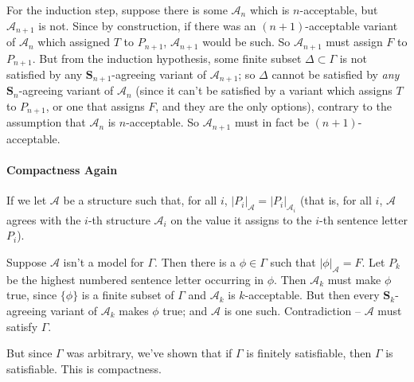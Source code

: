For the induction step, suppose there is some $\mathscr{A}_{n}$ which is $n$-acceptable, but $\mathscr{A}_{n+1}$ is not. Since by construction, if there was an $(n+1)$-acceptable variant of $\mathscr{A}_{n}$ which assigned $T$ to $P_{n+1}$, $\mathscr{A}_{n+1}$ would be such. So $\mathscr{A}_{n+1}$ must assign $F$ to $P_{n+1}$. But from the induction hypothesis, some finite subset $\Delta\subset \Gamma$ is not satisfied by any $\mathbf{S}_{n+1}$-agreeing variant of $\mathscr{A}_{n+1}$; so $\Delta$ cannot be satisfied by \emph{any} $\mathbf{S}_{n}$-agreeing variant of $\mathscr{A}_{n}$ (since it can't be satisfied by a variant which assigns $T$ to $P_{n+1}$, or one that assigns $F$, and they are the only options), contrary to the assumption that $\mathscr{A}_{n}$ is $n$-acceptable. So $\mathscr{A}_{n+1}$ must in fact be $(n+1)$-acceptable.


\paragraph{Compactness Again}

If we let $\mathscr{A}$ be a structure such that, for all $i$, $|P_{i}|_{\mathscr{A}}=|P_{i}|_{\mathscr{A}_{i}}$ (that is, for all $i$, $\mathscr{A}$ agrees with the $i$-th structure $\mathscr{A}_{i}$ on the value it assigns to the $i$-th sentence letter $P_{i}$). 

Suppose $\mathscr{A}$ isn't a model for $\Gamma$. Then there is a $\phi \in \Gamma$ such that $|\phi|_{\mathscr{A}}=F$. Let $P_{k}$ be the highest numbered sentence letter occurring in $\phi$. Then $\mathscr{A}_{k}$ must make $\phi$ true, since $\{\phi\}$ is a finite subset of $\Gamma$ and $\mathscr{A}_{k}$ is $k$-acceptable. But then every $\mathbf{S}_{k}$-agreeing variant of $\mathscr{A}_{k}$ makes $\phi$ true; and $\mathscr{A}$ is one such. Contradiction – $\mathscr{A}$ must satisfy $\Gamma$.

But since $\Gamma$ was arbitrary, we've shown that if $\Gamma$ is finitely satisfiable, then $\Gamma$ is satisfiable. This is compactness.
